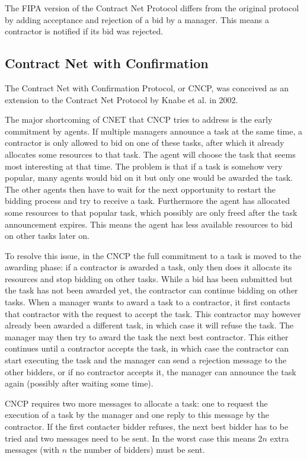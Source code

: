 \documentclass[10pt,a4paper]{article}
\begin{document}
The FIPA version of the Contract Net Protocol \cite{CNETStandard} differs from the original protocol by adding acceptance and rejection of a bid by a manager. This means a contractor is notified if its bid was rejected.

\subsection{Contract Net with Confirmation} 
The Contract Net with Confirmation Protocol, or CNCP, was conceived as an extension to the Contract Net Protocol by Knabe et al. in 2002. \cite{CNCP}

The major shortcoming of CNET that CNCP tries to address is the early commitment by agents. If multiple managers announce a task at the same time, a contractor is only allowed to bid on one of these tasks, after which it already allocates some resources to that task. The agent will choose the task that seems most interesting at that time. The problem is that if a task is somehow very popular, many agents would bid on it but only one would be awarded the task. The other agents then have to wait for the next opportunity to restart the bidding process and try to receive a task. Furthermore the agent has allocated some resources to that popular task, which possibly are only freed after the task announcement expires. This means the agent has less available resources to bid on other tasks later on.

To resolve this issue, in the CNCP the full commitment to a task is moved to the awarding phase: if a contractor is awarded a task, only then does it allocate its resources and stop bidding on other tasks. While a bid has been submitted but the task has not been awarded yet, the contractor can continue bidding on other tasks. When a manager wants to award a task to a contractor, it first contacts that contractor with the request to accept the task. This contractor may however already been awarded a different task, in which case it will refuse the task. The manager may then try to award the task the next best contractor. This either continues until a contractor accepts the task, in which case the contractor can start executing the task and the manager can send a rejection message to the other bidders, or if no contractor accepts it, the manager can announce the task again (possibly after waiting some time).

CNCP requires two more messages to allocate a task: one to request the execution of a task by the manager and one reply to this message by the contractor. If the first contacter bidder refuses, the next best bidder has to be tried and two messages need to be sent. In the worst case this means 2$n$ extra messages (with $n$ the number of bidders) must be sent.
\end{document}
